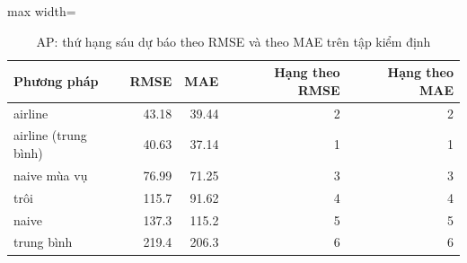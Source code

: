 \begin{table}[H]
\centering\footnotesize
\caption{AP: thứ hạng sáu dự báo theo RMSE và theo MAE trên tập kiểm định}\label{tab:tab_b12_13_ranking}
\begin{adjustbox}{max width=\linewidth}
\begin{tabular}{|l|r|r|r|r|}
\toprule
Phương pháp & RMSE & MAE & Hạng theo RMSE & Hạng theo MAE \\
\midrule
airline & 43.18 & 39.44 & 2 & 2 \\
airline (trung bình) & 40.63 & 37.14 & 1 & 1 \\
naive mùa vụ & 76.99 & 71.25 & 3 & 3 \\
trôi & 115.7 & 91.62 & 4 & 4 \\
naive & 137.3 & 115.2 & 5 & 5 \\
trung bình & 219.4 & 206.3 & 6 & 6 \\
\bottomrule
\end{tabular}
\end{adjustbox}
\end{table}
